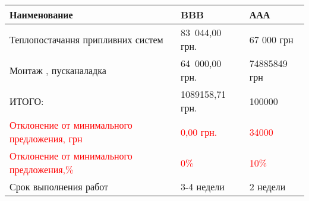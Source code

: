 \usepackage[a4paper,margin=1in,landscape]{geometry}
\usepackage[table]{xcolor}
\usepackage{colortbl,hhline}




\vspace{1cm}

\begin{tabularx}{\textwidth}{ |X|X|X| }
\hline
\textbf{Наименование} & \textbf{BBB} & \textbf{ААА} \\ \hline
Теплопостачання припливних систем & 83 044,00 грн. & 67 000 грн \\ \hline
Монтаж , пусканаладка & 64 000,00 грн. & 74885849 грн \\ \hline
\rowcolor{yellow}
ИТОГО: & 1089158,71 грн. & 100000 \\ \hline
\textcolor{red}{Отклонение от минимального предложения, грн} & \textcolor{red}{0,00 грн.} & \textcolor{red}{34000} \\ \hline
\textcolor{red}{ Отклонение от минимального предложения,\%} & \textcolor{red}{ 0\%} & \textcolor{red}{10\%}  \\ \hline
Срок выполнения работ & 3-4 недели & 2 недели \\ \hline
\end{tabularx}
\vspace{1cm}



